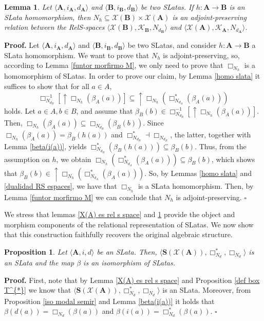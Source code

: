 \documentclass{article}
\newtheorem{lemma}{\bf Lemma}[section]
\newtheorem{proposition}{\bf Proposition}[section]
\newenvironment{proof}
{\par\noindent\textbf{Proof. }\rm}
{\hfill$\boldsymbol{\square}$\par\vspace{0.3cm}}
\begin{document}
\begin{lemma}\label{R_h apropiada}
Let $\langle \mathbf{A}, i_{\mathbf{A}}, d_{\mathbf{A}} \rangle$ and 
$\langle \mathbf{B}, i_{\mathbf{B}}, d_{\mathbf{B}} \rangle$ be two SLatas. 
If $h:\mathbf{A}\to \mathbf{B}$ is an SLata homomorphism, then 
$N_h \subseteq \mathcal{X}(\mathbf{B}) \times \mathcal{X}(\mathbf{A})$ 
is an adjoint-preserving relation between the RelS-spaces 
$\langle \mathcal{X}(\mathbf{B}), \mathcal{K}_{\mathbf{B}}, N_{d_{\mathbf{B}}} \rangle$ 
and 
$\langle \mathcal{X}(\mathbf{A}), \mathcal{K}_{\mathbf{A}}, N_{d_{\mathbf{A}}} \rangle$.
\end{lemma}

\begin{proof}
    Let $\langle \mathbf{A}, i_{\mathbf{A}}, d_\mathbf{A}\rangle$ and $\langle \mathbf{B}, i_{\mathbf{B}}, d_\mathbf{B}\rangle$ be two SLatas, and consider $h:\mathbf{A}\to \mathbf{B}$ a SLata homomorphism. We want to prove that $N_h$ is adjoint-preserving, so, according to Lemma \ref{funtor morfirmo M}, we only need to prove that $\Box_{N_h}$ is a homomorphism of SLatas. In order to prove our claim, by Lemma \ref{homo slata} it suffices to show that for all $a\in A$,
\[
\Box_{N_{d_B}}^{-1}[\uparrow\Box_{N_h}(\beta_A(a))]\subseteq\uparrow\Box_{N_h}(\Box_{N_{d_A}}^{*}(\beta_A(a)))
\]
holds. Let $a \in A,b \in B$, and assume that $\beta_B(b) \in \Box_{N_{d_B}}^{-1}[\uparrow\Box_{N_h}(\beta_A(a))]$. Then, $\Box_{N_h}(\beta_A(a)) \subseteq \Box_{N_{d_B}}(\beta_B(b))$. Since $\Box_{N_h}(\beta_A(a))=\beta_B(h(a))$ and $\Box_{N_{d_B}}^{*}\dashv \Box_{N_{d_B}}$, the latter, together with Lemma \ref{beta(i(a))}, yields $\Box_{N_{d_B}}^{*}(\beta_B(h(a)))\subseteq \beta_B(b)$. Thus, from the assumption on $h$, we obtain $\Box_{N_h}(\Box_{N_{d_A}}^{*}(\beta_A(a))) \subseteq \beta_B(b)$, which shows that $\beta_B(b) \in \uparrow\Box_{N_h}(\Box_{N_{d_A}}^{*}(\beta_A(a)))$. So, by Lemmas \ref{homo slata} and \ref{dualidad RS espaces}, we have that $\Box_{N_h}$ is a SLata homomorphism. Then, by Lemma \ref{funtor morfirmo M} we can conclude that $N_h$ is adjoint-preserving.
\end{proof}

We stress that lemmas \ref{X(A) es rel s space} and \ref{R_h apropiada} provide the object and morphism components of the relational representation of SLatas. We now show that this construction faithfully recovers the original algebraic structure.

\begin{proposition}\label{iso S-Lata}
      Let $\langle\mathbf{A},i,d\rangle$ be an SLata. Then, $\langle \mathbf{S}(\mathcal{X}(\mathbf{A})), \Box_{N_d}^{*},\Box_{N_d}\rangle$ is an SLata and the map $\beta$ is an isomorphism of SLatas.
 \end{proposition}
     \begin{proof}
         First, note that by Lemma \ref{X(A) es rel s space} and Proposition \ref{def box T^{*}} we know that $\langle \mathbf{S}(\mathcal{X}(\mathbf{A})), \Box_{N_d}^{*},\Box_{N_d}\rangle$ is an SLata. Moreover, from Proposition \ref{iso modal semir} and Lemma \ref{beta(i(a))} it holds that $\beta(d(a))=\Box_{N_d}(\beta(a))$ and $\beta(i(a))=\Box_{N_d}^{*}(\beta(a))$. 
     \end{proof}
\end{document}
